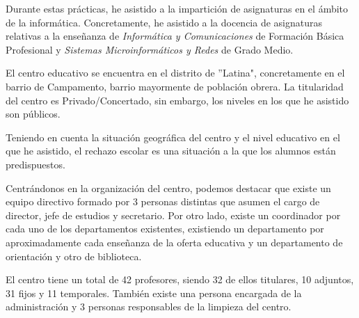 \documentclass[spanish,12pt, a4paper,twoside]{paper}
\begin{document}
Durante estas prácticas, he asistido a la impartición de asignaturas en el ámbito de la informática. Concretamente, he asistido a la docencia de asignaturas relativas a la enseñanza de \textit{Informática y Comunicaciones} de Formación Básica Profesional y \textit{Sistemas Microinformáticos y Redes} de Grado Medio.

El centro educativo se encuentra en el distrito de ''Latina", concretamente en el barrio de Campamento, barrio mayormente de población obrera. La titularidad del centro es Privado/Concertado, sin embargo, los niveles en los que he asistido son públicos. 

Teniendo en cuenta la situación geográfica del centro y el nivel educativo en el que he asistido, el rechazo escolar es una situación a la que los alumnos están predispuestos. 

Centrándonos en la organización del centro, podemos destacar que existe un equipo directivo formado por 3 personas distintas que asumen el cargo de director, jefe de estudios y secretario. Por otro lado, existe un coordinador por cada uno de los departamentos existentes, existiendo un departamento por aproximadamente cada enseñanza de la oferta educativa y un departamento de orientación y otro de biblioteca.

El centro tiene un total de 42 profesores, siendo 32 de ellos titulares, 10 adjuntos, 31 fijos y 11 temporales. También existe una persona encargada de la administración y 3 personas responsables de la limpieza del centro.
\end{document}
